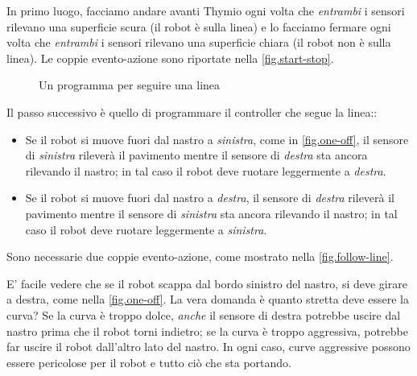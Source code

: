 In primo luogo, facciamo andare avanti Thymio ogni volta che \emph{entrambi}  i sensori rilevano
una superficie scura (il robot è sulla linea) e lo facciamo fermare ogni volta che \emph{entrambi}  i sensori rilevano una
superficie chiara (il robot non è sulla linea).
Le coppie evento-azione sono riportate nella \cref{fig.start-stop}.



\begin{figure}
	\hfill
	\caption{Un programma per seguire una linea}
\end{figure}


Il passo successivo è quello di programmare il controller che segue la linea::
\begin{itemize}

\item Se il robot si muove fuori dal nastro a \emph{sinistra}, come in \cref{fig.one-off}, il
 sensore di \emph{sinistra} rileverà il pavimento mentre il sensore di \emph{destra}
sta ancora rilevando il nastro; in tal caso il robot deve ruotare leggermente
a \emph{destra}.
\item Se il robot si muove fuori dal nastro a \emph{destra}, il
 sensore di \emph{destra} rileverà il pavimento mentre il sensore di \emph{sinistra}
sta ancora rilevando il nastro; in tal caso il robot deve ruotare leggermente
a \emph{sinistra}.

\end{itemize}

Sono necessarie due coppie evento-azione, come mostrato nella \cref{fig.follow-line}.


E' facile vedere che se il robot scappa dal bordo sinistro del nastro, si deve girare a destra, come nella \cref{fig.one-off}.
La vera domanda è quanto stretta deve essere la curva?
Se la curva è troppo dolce, \emph{anche} il sensore di destra potrebbe uscire dal nastro prima che il robot torni indietro;
se la curva è troppo aggressiva, potrebbe far uscire il robot dall'altro lato del nastro. In ogni caso, curve aggressive possono essere pericolose per il robot e tutto ciò che sta portando.

